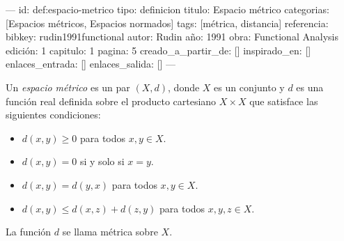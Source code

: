 ---
id: def:espacio-metrico
tipo: definicion
titulo: Espacio métrico
categorias: [Espacios métricos, Espacios normados]
tags: [métrica, distancia]
referencia:
    bibkey: rudin1991functional 
    autor: Rudin
    año: 1991
    obra: Functional Analysis
    edición: 1
    capitulo: 1
    pagina: 5   
creado_a_partir_de: []
inspirado_en: []
enlaces_entrada: []
enlaces_salida: []
---

\begin{definition}
Un \textit{espacio métrico} es un par $(X, d)$, donde $X$ es un conjunto y $d$ es una función real definida sobre el producto cartesiano $X \times X$ que satisface las siguientes condiciones:

\begin{itemize}
  \item $d(x, y) \geq 0$ para todos $x, y \in X$.
  \item $d(x, y) = 0$ si y solo si $x = y$.
  \item $d(x, y) = d(y, x)$ para todos $x, y \in X$.
  \item $d(x, y) \leq d(x, z) + d(z, y)$ para todos $x, y, z \in X$.
\end{itemize}

La función $d$ se llama métrica sobre $X$.
\end{definition}
